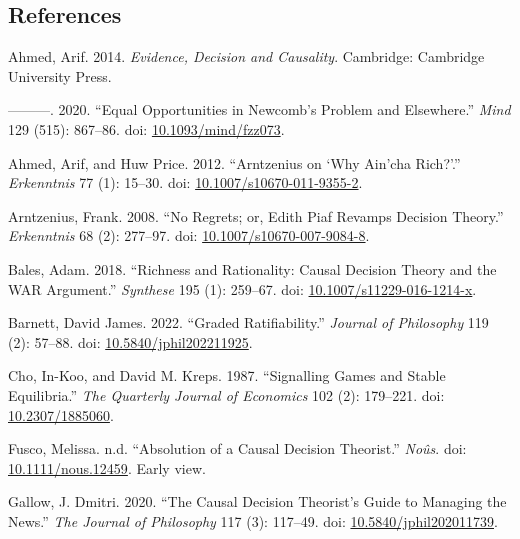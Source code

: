 \documentclass[
  11pt,
  letterpaper,
  DIV=11,
  numbers=noendperiod,
  twoside]{scrartcl}
\newlength{\cslhangindent}
\newenvironment{CSLReferences}[2] %
 {\begin{list}{}{%
  \setlength{\itemindent}{0pt}
  \setlength{\leftmargin}{0pt}
  \setlength{\parsep}{0pt}
  \ifodd #1
   \setlength{\leftmargin}{\cslhangindent}
   \setlength{\itemindent}{-1\cslhangindent}
  \fi
  \setlength{\itemsep}{#2\baselineskip}}}
 {\end{list}}
\begin{document}
\subsection*{References}\label{references}

\label{refs}
\begin{CSLReferences}{1}{0}
Ahmed, Arif. 2014. \emph{Evidence, Decision and Causality}. Cambridge:
{C}ambridge {U}niversity {P}ress.

---------. 2020. {``Equal Opportunities in Newcomb's Problem and
Elsewhere.''} \emph{Mind} 129 (515): 867--86. doi:
\href{https://doi.org/10.1093/mind/fzz073}{10.1093/mind/fzz073}.

Ahmed, Arif, and Huw Price. 2012. {``Arntzenius on `Why Ain'cha
Rich?'.''} \emph{Erkenntnis} 77 (1): 15--30. doi:
\href{https://doi.org/10.1007/s10670-011-9355-2}{10.1007/s10670-011-9355-2}.

Arntzenius, Frank. 2008. {``No Regrets; or, Edith Piaf Revamps Decision
Theory.''} \emph{Erkenntnis} 68 (2): 277--97. doi:
\href{https://doi.org/10.1007/s10670-007-9084-8}{10.1007/s10670-007-9084-8}.

Bales, Adam. 2018. {``Richness and Rationality: Causal Decision Theory
and the WAR Argument.''} \emph{Synthese} 195 (1): 259--67. doi:
\href{https://doi.org/10.1007/s11229-016-1214-x}{10.1007/s11229-016-1214-x}.

Barnett, David James. 2022. {``Graded Ratifiability.''} \emph{Journal of
Philosophy} 119 (2): 57--88. doi:
\href{https://doi.org/10.5840/jphil202211925}{10.5840/jphil202211925}.

Cho, In-Koo, and David M. Kreps. 1987. {``Signalling Games and Stable
Equilibria.''} \emph{The Quarterly Journal of Economics} 102 (2):
179--221. doi: \href{https://doi.org/10.2307/1885060}{10.2307/1885060}.

Fusco, Melissa. n.d. {``Absolution of a Causal Decision Theorist.''}
\emph{No{û}s}. doi:
\href{https://doi.org/10.1111/nous.12459}{10.1111/nous.12459}. Early
view.

Gallow, J. Dmitri. 2020. {``The Causal Decision Theorist's Guide to
Managing the News.''} \emph{The Journal of Philosophy} 117 (3): 117--49.
doi:
\href{https://doi.org/10.5840/jphil202011739}{10.5840/jphil202011739}.


\end{CSLReferences}
\end{document}
